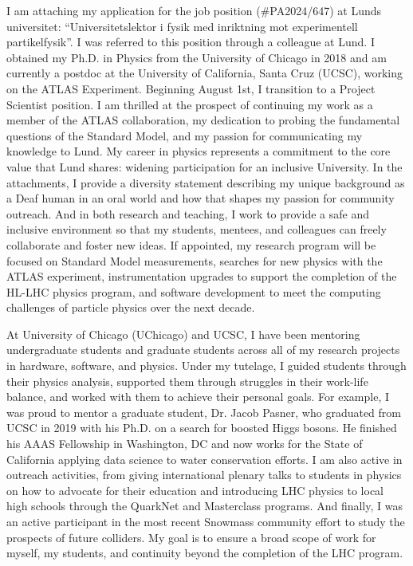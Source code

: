 
I am attaching my application for the job position (\#PA2024/647) at Lunds universitet: \enquote{Universitetslektor i fysik med inriktning mot experimentell partikelfysik}. I was referred to this position through a colleague at Lund. I obtained my Ph.D. in Physics from the University of Chicago in 2018 and am currently a postdoc at the University of California, Santa Cruz (UCSC), working on the ATLAS Experiment. Beginning August 1st, I transition to a Project Scientist position. I am thrilled at the prospect of continuing my work as a member of the ATLAS collaboration, my dedication to probing the fundamental questions of the Standard Model, and my passion for communicating my knowledge to Lund. My career in physics represents a commitment to the core value that Lund shares: widening participation for an inclusive University. In the attachments, I provide a diversity statement describing my unique background as a Deaf human in an oral world and how that shapes my passion for community outreach. And in both research and teaching, I work to provide a safe and inclusive environment so that my students, mentees, and colleagues can freely collaborate and foster new ideas. If appointed, my research program will be focused on Standard Model measurements, searches for new physics with the ATLAS experiment, instrumentation upgrades to support the completion of the HL-LHC physics program, and software development to meet the computing challenges of particle physics over the next decade.

At University of Chicago (UChicago) and UCSC, I have been mentoring undergraduate students and graduate students across all of my research projects in hardware, software, and physics. Under my tutelage, I guided students through their physics analysis, supported them through struggles in their work-life balance, and worked with them to achieve their personal goals. For example, I was proud to mentor a graduate student, Dr. Jacob Pasner, who graduated from UCSC in 2019 with his Ph.D. on a search for boosted Higgs bosons. He finished his AAAS Fellowship in Washington, DC and now works for the State of California applying data science to water conservation efforts. I am also active in outreach activities, from giving international plenary talks to students in physics on how to advocate for their education and introducing LHC physics to local high schools through the QuarkNet and Masterclass programs. And finally, I was an active participant in the most recent Snowmass community effort to study the prospects of future colliders. My goal is to ensure a broad scope of work for myself, my students, and continuity beyond the completion of the LHC program.


